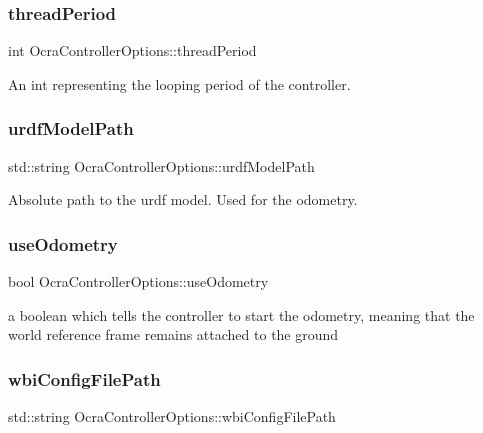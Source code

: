 \subsubsection{\texorpdfstring{thread\+Period}{threadPeriod}}
{\footnotesize\ttfamily int Ocra\+Controller\+Options\+::thread\+Period}

An int representing the looping period of the controller. \hypertarget{classOcraControllerOptions_a697196e6267b2a519dd0bcc2bc03ab73}{}\label{classOcraControllerOptions_a697196e6267b2a519dd0bcc2bc03ab73} 
\subsubsection{\texorpdfstring{urdf\+Model\+Path}{urdfModelPath}}
{\footnotesize\ttfamily std\+::string Ocra\+Controller\+Options\+::urdf\+Model\+Path}

Absolute path to the urdf model. Used for the odometry. \hypertarget{classOcraControllerOptions_a335f09b446b6d10e2a8e6eb453391d9e}{}\label{classOcraControllerOptions_a335f09b446b6d10e2a8e6eb453391d9e} 
\subsubsection{\texorpdfstring{use\+Odometry}{useOdometry}}
{\footnotesize\ttfamily bool Ocra\+Controller\+Options\+::use\+Odometry}

a boolean which tells the controller to start the odometry, meaning that the world reference frame remains attached to the ground \hypertarget{classOcraControllerOptions_af3a98210531cf667c2838e45b470a66e}{}\label{classOcraControllerOptions_af3a98210531cf667c2838e45b470a66e} 
\subsubsection{\texorpdfstring{wbi\+Config\+File\+Path}{wbiConfigFilePath}}
{\footnotesize\ttfamily std\+::string Ocra\+Controller\+Options\+::wbi\+Config\+File\+Path}

